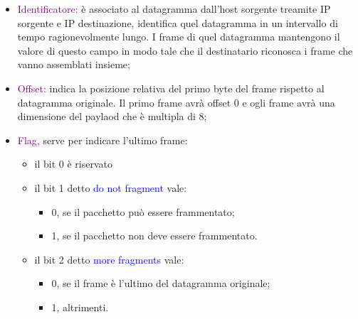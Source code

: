 \begin{itemize}
    \item \textcolor{purple}{Identificatore:} è associato al datagramma dall’host sorgente treamite IP sorgente e IP destinazione, identifica quel datagramma in un intervallo di tempo ragionevolmente lungo. I frame di quel datagramma mantengono il valore di questo campo in modo tale che il destinatario riconosca i frame che vanno assemblati insieme;
    \item \textcolor{purple}{Offset:} indica la posizione relativa del primo byte del frame rispetto al datagramma originale. Il primo frame avrà offset 0 e ogli frame avrà una dimensione del paylaod che è multipla di 8; 
    \item \textcolor{purple}{Flag,} serve per indicare l'ultimo frame:
        \begin{itemize}
            \item il bit 0 è riservato
            \item il bit 1 detto \textcolor{blue}{do not fragment} vale:
                \begin{itemize}
                    \item 0, se il pacchetto può essere frammentato;
                    \item 1, se il pacchetto non deve essere frammentato.
                \end{itemize}
            \item il bit 2 detto \textcolor{blue}{more fragments} vale:
                \begin{itemize}
                    \item 0, se il frame è l'ultimo del datagramma originale;
                    \item 1, altrimenti.
                \end{itemize}
        \end{itemize}
\end{itemize}


